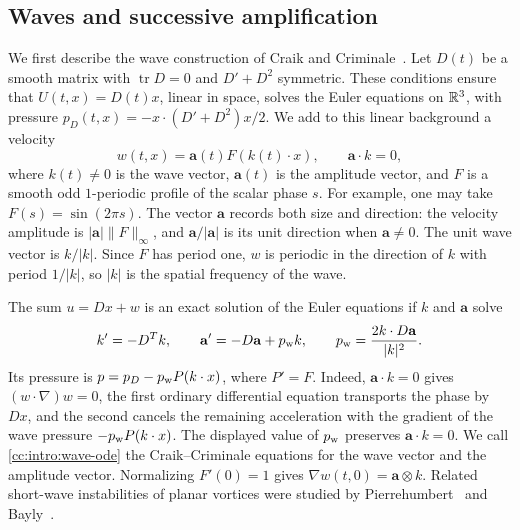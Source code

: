 \subsection{Waves and successive amplification}\label{cc:sec:intro-waves}
We first describe the wave construction of Craik and
Criminale~\cite{CraikCriminale}. Let $D(t)$ be a smooth matrix with
$\operatorname{tr}D=0$ and $D'+D^2$ symmetric. These conditions ensure that
$U(t,x)=D(t)x$, linear in space, solves the Euler equations on $\mathbb R^3$, with pressure
$p_D(t,x)=-x\cdot(D'+D^2)x/2$. We add to this linear background a velocity
\[
 w(t,x)=\mathbf a(t)F(k(t)\cdot x),\qquad \mathbf a\cdot k=0,
\]
where $k(t)\ne0$ is the wave vector, $\mathbf a(t)$ is the amplitude
vector, and $F$ is a smooth odd $1$-periodic profile of the scalar phase $s$.
For example, one may take $F(s)=\sin(2\pi s)$. The vector $\mathbf a$
records both size and direction: the velocity amplitude is $|\mathbf a|\|F\|_\infty$, and
$\mathbf a/|\mathbf a|$ is its unit direction when $\mathbf a\ne0$.
The unit wave vector is $k/|k|$. Since $F$ has period one, $w$ is
periodic in the direction of $k$ with period $1/|k|$, so $|k|$ is the
spatial frequency of the wave.

The sum $u=Dx+w$ is an exact solution of the Euler equations if $k$ and $\mathbf a$ solve
\begin{equation}\label{cc:intro:wave-ode}
 k'=-D^Tk,\qquad
 \mathbf a'=-D\mathbf a+p_{\rm w} k,\qquad
 p_{\rm w}=\frac{2k\cdot D\mathbf a}{|k|^2}.
\end{equation}
Its pressure is $p=p_D-p_{\rm w} P(k\cdot x)$, where $P'=F$.
Indeed, $\mathbf a\cdot k=0$ gives $(w\cdot\nabla)w=0$, the first
ordinary differential equation transports the phase by $Dx$, and the
second cancels the remaining acceleration with the gradient of the
wave pressure $-p_{\rm w}P(k\cdot x)$.
The displayed value of $p_{\rm w}$ preserves $\mathbf a\cdot k=0$.
We call \eqref{cc:intro:wave-ode} the Craik--Criminale equations for the
wave vector and the amplitude vector. Normalizing $F'(0)=1$ gives
$\nabla w(t,0)=\mathbf a\otimes k$.
Related short-wave instabilities of planar vortices were studied by
Pierrehumbert~\cite{Pierrehumbert1986} and Bayly~\cite{Bayly1986}.

